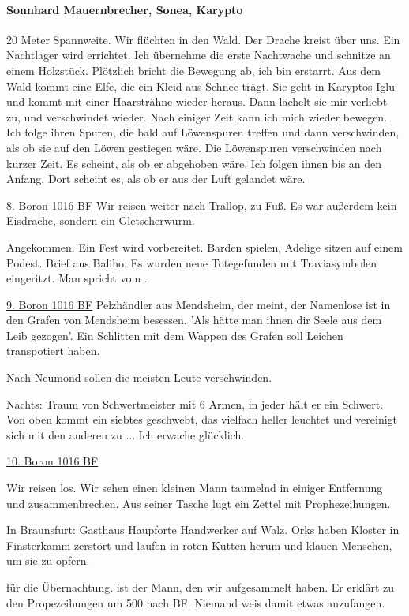 \paragraph{Sonnhard Mauernbrecher, Sonea, Karypto}
20 Meter Spannweite. Wir flüchten in den Wald. Der Drache kreist über uns. Ein Nachtlager wird errichtet. Ich übernehme die erste Nachtwache und schnitze an einem Holzstück. Plötzlich bricht die Bewegung ab, ich bin erstarrt. Aus dem Wald kommt eine Elfe, die ein Kleid aus Schnee trägt. Sie geht in Karyptos Iglu und kommt mit einer Haarsträhne wieder heraus. Dann lächelt sie mir verliebt zu, und verschwindet wieder. Nach einiger Zeit kann ich mich wieder bewegen. Ich folge ihren Spuren, die bald auf Löwenspuren treffen und dann verschwinden, als ob sie auf den Löwen gestiegen wäre. Die Löwenspuren verschwinden nach kurzer Zeit. Es scheint, als ob er abgehoben wäre. Ich folgen ihnen bis an den Anfang. Dort scheint es, als ob er aus der Luft gelandet wäre. 

\underline{8. Boron 1016 BF}
Wir reisen weiter nach Trallop, zu Fuß. Es war außerdem kein Eisdrache, sondern ein Gletscherwurm. 

Angekommen. Ein Fest wird vorbereitet. Barden spielen, Adelige sitzen auf einem Podest. 
 Brief aus Baliho. Es wurden neue Totegefunden mit Traviasymbolen eingeritzt. Man spricht vom . 

\underline{9. Boron 1016 BF} 
Pelzhändler aus Mendsheim, der meint, der Namenlose ist in den Grafen von Mendsheim besessen. 'Als hätte man ihnen dir Seele aus dem Leib gezogen'. Ein Schlitten mit dem Wappen des Grafen soll Leichen transpotiert haben.    

Nach Neumond sollen die meisten Leute verschwinden. 

Nachts: Traum von Schwertmeister mit 6 Armen, in jeder hält er ein Schwert. Von oben kommt ein siebtes geschwebt, das vielfach heller leuchtet und vereinigt sich mit den anderen zu ... Ich erwache glücklich. 

\underline{10. Boron 1016 BF}

Wir reisen los. Wir sehen einen kleinen Mann taumelnd in einiger Entfernung und zusammenbrechen. Aus seiner Tasche lugt ein Zettel mit Prophezeihungen. 

In Braunsfurt: Gasthaus Haupforte Handwerker  auf Walz. Orks haben Kloster in Finsterkamm zerstört und laufen in roten Kutten herum und klauen Menschen, um sie zu opfern. 


  für die Übernachtung.  ist der Mann, den wir aufgesammelt haben. Er erklärt zu den Propezeihungen  um 500 nach BF. Niemand weis damit etwas anzufangen. 

